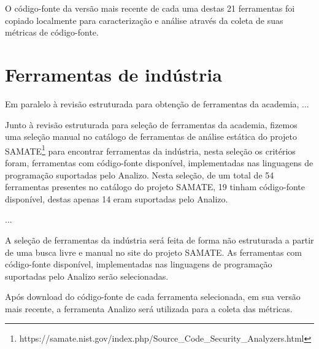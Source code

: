 O código-fonte da versão mais recente de cada uma destas 21 ferramentas foi
copiado localmente para caracterização e análise através da coleta de suas
métricas de código-fonte.


\section{Ferramentas de indústria} \label{ferramentas-da-industria}

Em paralelo à revisão estruturada para obtenção de ferramentas da academia, ...

Junto à revisão estruturada para seleção de ferramentas da academia, fizemos
uma seleção manual no catálogo de ferramentas de análise estática do projeto
SAMATE\footnote{https://samate.nist.gov/index.php/Source\_Code\_Security\_Analyzers.html}
para encontrar ferramentas da indústria, nesta seleção os critérios foram,
ferramentas com código-fonte disponível, implementadas nas linguagens de
programação suportadas pelo Analizo. Nesta seleção, de um total de 54 ferramentas
presentes no catálogo do projeto SAMATE, 19 tinham código-fonte
disponível, destas apenas 14 eram suportadas pelo Analizo.

...

A seleção de ferramentas da indústria será feita de forma não estruturada a
partir de uma busca livre e manual no site do projeto SAMATE. As ferramentas
com código-fonte disponível, implementadas nas linguagens de programação
suportadas pelo Analizo serão selecionadas.

Após download do código-fonte de cada ferramenta selecionada, em sua versão
mais recente, a ferramenta Analizo será utilizada para a coleta das métricas. 

